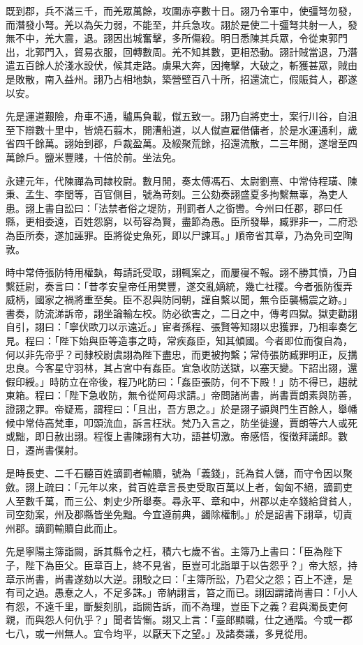 \begin{pinyinscope}
既到郡，兵不滿三千，而羌眾萬餘，攻圍赤亭數十日。詡乃令軍中，使彊弩勿發，而潛發小弩。羌以為矢力弱，不能至，并兵急攻。詡於是使二十彊弩共射一人，發無不中，羌大震，退。詡因出城奮擊，多所傷殺。明日悉陳其兵眾，令從東郭門出，北郭門入，貿易衣服，回轉數周。羌不知其數，更相恐動。詡計賊當退，乃潛遣五百餘人於淺水設伏，候其走路。虜果大奔，因掩擊，大破之，斬獲甚眾，賊由是敗散，南入益州。詡乃占相地埶，築營壁百八十所，招還流亡，假賑貧人，郡遂以安。

先是運道艱險，舟車不通，驢馬負載，僦五致一。詡乃自將吏士，案行川谷，自沮至下辯數十里中，皆燒石翦木，開漕船道，以人僦直雇借傭者，於是水運通利，歲省四千餘萬。詡始到郡，戶裁盈萬。及綏聚荒餘，招還流散，二三年閒，遂增至四萬餘戶。鹽米豐賤，十倍於前。坐法免。

永建元年，代陳禪為司隸校尉。數月閒，奏太傅馮石、太尉劉熹、中常侍程璜、陳秉、孟生、李閏等，百官側目，號為苛刻。三公劾奏詡盛夏多拘繫無辜，為吏人患。詡上書自訟曰：「法禁者俗之堤防，刑罰者人之銜轡。今州曰任郡，郡曰任縣，更相委遠，百姓怨窮，以苟容為賢，盡節為愚。臣所發舉，臧罪非一，二府恐為臣所奏，遂加誣罪。臣將從史魚死，即以尸諫耳。」順帝省其章，乃為免司空陶敦。

時中常侍張防特用權埶，每請託受取，詡輒案之，而屢寑不報。詡不勝其憤，乃自繫廷尉，奏言曰：「昔孝安皇帝任用樊豐，遂交亂嫡統，幾亡社稷。今者張防復弄威柄，國家之禍將重至矣。臣不忍與防同朝，謹自繫以聞，無令臣襲楊震之跡。」書奏，防流涕訴帝，詡坐論輸左校。防必欲害之，二日之中，傳考四獄。獄吏勸詡自引，詡曰：「寧伏歐刀以示遠近。」宦者孫程、張賢等知詡以忠獲罪，乃相率奏乞見。程曰：「陛下始與臣等造事之時，常疾姦臣，知其傾國。今者即位而復自為，何以非先帝乎？司隸校尉虞詡為陛下盡忠，而更被拘繫；常侍張防臧罪明正，反搆忠良。今客星守羽林，其占宮中有姦臣。宜急收防送獄，以塞天變。下詔出詡，還假印綬。」時防立在帝後，程乃叱防曰：「姦臣張防，何不下殿！」防不得已，趨就東箱。程曰：「陛下急收防，無令從阿母求請。」帝問諸尚書，尚書賈朗素與防善，證詡之罪。帝疑焉，謂程曰：「且出，吾方思之。」於是詡子顗與門生百餘人，舉幡候中常侍高梵車，叩頭流血，訴言枉狀。梵乃入言之，防坐徙邊，賈朗等六人或死或黜，即日赦出詡。程復上書陳詡有大功，語甚切激。帝感悟，復徵拜議郎。數日，遷尚書僕射。

是時長吏、二千石聽百姓謫罰者輸贖，號為「義錢」，託為貧人儲，而守令因以聚斂。詡上疏曰：「元年以來，貧百姓章言長吏受取百萬以上者，匈匈不絕，謫罰吏人至數千萬，而三公、刺史少所舉奏。尋永平、章和中，州郡以走卒錢給貸貧人，司空劾案，州及郡縣皆坐免黜。今宜遵前典，蠲除權制。」於是詔書下詡章，切責州郡。謫罰輸贖自此而止。

先是寧陽主簿詣闕，訴其縣令之枉，積六七歲不省。主簿乃上書曰：「臣為陛下子，陛下為臣父。臣章百上，終不見省，臣豈可北詣單于以告怨乎？」帝大怒，持章示尚書，尚書遂劾以大逆。詡駮之曰：「主簿所訟，乃君父之怨；百上不達，是有司之過。愚惷之人，不足多誅。」帝納詡言，笞之而已。詡因謂諸尚書曰：「小人有怨，不遠千里，斷髮刻肌，詣闕告訴，而不為理，豈臣下之義？君與濁長吏何親，而與怨人何仇乎？」聞者皆慚。詡又上言：「臺郎顯職，仕之通階。今或一郡七八，或一州無人。宜令均平，以厭天下之望。」及諸奏議，多見從用。


\end{pinyinscope}
